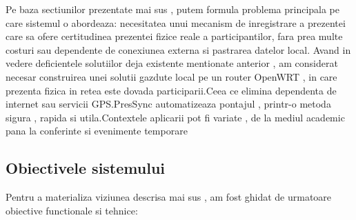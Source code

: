 \documentclass[11pt]{article}
\begin{document}
Pe baza sectiunilor prezentate mai sus , putem formula problema principala pe care sistemul o abordeaza: necesitatea unui mecanism de inregistrare a prezentei care sa ofere certitudinea prezentei fizice reale a participantilor, fara prea multe costuri sau dependente de conexiunea externa si pastrarea datelor local.
Avand in vedere deficientele solutiilor deja existente mentionate anterior , am considerat necesar construirea unei solutii gazdute local pe un router OpenWRT , in care prezenta fizica in retea este dovada participarii.Ceea ce elimina dependenta de internet sau servicii GPS.PresSync automatizeaza pontajul , printr-o metoda sigura , rapida si utila.Contextele aplicarii pot fi variate , de la mediul academic pana la conferinte si evenimente temporare

\subsection{Obiectivele sistemului}

Pentru a materializa viziunea descrisa mai sus , am fost ghidat de urmatoare obiective functionale si tehnice:
\end{document}
